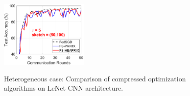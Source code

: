 \documentclass[twoside]{article}
\begin{document}
\begin{figure}[H]
\begin{center}
{		\includegraphics[width=1.7in]{MNIST_figures/local5_sketch50_iid0_test_acc.eps}
		}
	\end{center}
	\caption{Heterogeneous case: Comparison of compressed optimization algorithms on LeNet CNN architecture.}
    \label{fig:MNIST-iid0}
\end{figure}
\end{document}
